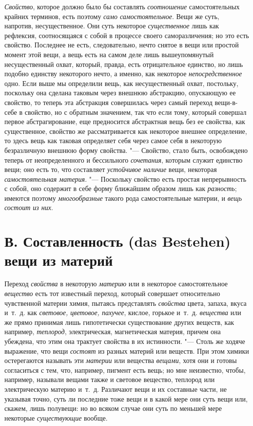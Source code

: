 {\em Свойство}, которое должно было бы составлять
{\em соотношение} самостоятельных крайних терминов,
есть поэтому {\em само самостоятельное}. Вещи же суть,
напротив, несущественное. Они суть некоторое
{\em существенное} лишь как рефлексия, соотносящаяся с
собой в процессе своего саморазличения; но это есть свойство. Последнее не
есть, следовательно, нечто снятое в вещи или простой момент этой вещи, а
вещь есть на самом деле лишь вышеупомянутый несущественный охват, который,
правда, есть отрицательное единство, но лишь подобно единству некоторого
нечто, а именно, как некоторое {\em непосредственное}
одно. Если выше мы определили вещь, как несущественный охват, постольку,
поскольку она сделана таковым через внешнюю абстракцию, опускающую ее
свойство, то теперь эта абстракция совершилась через самый переход
вещи-в-себе в свойство, но с обратным значением, так что если тому, который
совершал первое абстрагирование, еще предносится абстрактная вещь без ее
свойства, как существенное, свойство же рассматривается как некоторое
внешнее определение, то здесь вещь как таковая определяет себя через самое
себя в некоторую безразличную внешнюю форму свойства. "--- Свойство, стало
быть, освобождено теперь от неопределенного и бессильного
{\em сочетания}, которым служит единство вещи; оно есть
то, что составляет {\em устойчивое наличие} вещи,
некоторая {\em самостоятельная материя}. "--- Поскольку
свойство есть простая непрерывность с собой, оно содержит в себе форму
ближайшим образом лишь как {\em разность}; имеются
поэтому {\em многообразные} такого рода самостоятельные
материи, и {\em вещь состоит из них}.


\section[В. Составленность (das Bestehen) вещи из материй]
{В. Составленность (das Bestehen) вещи из материй}

Переход {\em свойства} в
некоторую {\em материю} или в некоторое самостоятельное
{\em вещество} есть тот известный переход, который
совершает относительно чувственной материи химия, пытаясь представлять
{\em свойства} цвета, запаха, вкуса и~т.~д. как
{\em световое, цветовое, пахучее}, кислое, горькое
и~т.~д. {\em вещества} или же прямо принимая лишь
гипотетически существование других веществ, как например,
{\em теплород}, электрическая, магнетическая материя,
причем она убеждена, что этим она трактует свойства в их истинности. "---
Столь же ходяче выражение, что вещи {\em состоят} из
разных материй или веществ. При этом химики остерегаются называть эти
{\em материи} или вещества
{\em вещами}, хотя они и готовы согласиться с тем, что,
например, пигмент есть вещь; но мне неизвестно, чтобы, например, называли
вещами также и световое вещество, теплород или электрическую материю
и~т.~д. Различают вещи и их составные части, не указывая точно, суть ли
последние тоже вещи и в какой мере они суть вещи или, скажем, лишь
полувещи: но во всяком случае они суть по меньшей мере некоторые
{\em существующие} вообще.

